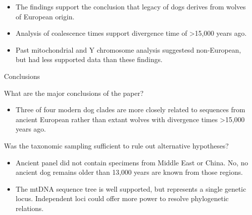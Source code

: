 \documentclass[12pt,a4paper]{article}
\begin{document}
\begin{itemize}
\begin{itemize}
                \begin{itemize}
                    \item The findings support the conclusion that legacy of dogs derives from wolves of European origin.
                    \item Analysis of coalescence times support divergence time of >15,000 years ago.
                    \item Past mitochondrial and Y chromosome analysis suggestesd non-European, but had less supported data than these findings.
                \end{itemize}
        \end{itemize}
    \item Conclusions
        \begin{itemize}
            {\color{darklc} \item  What are the major conclusions of the paper?}
                \begin{itemize}
                    \item Three of four modern dog clades are more closely related to sequences from ancient European rather than extant wolves with divergence times >15,000 years ago.
                \end{itemize}
            {\color{darklc} \item  Was the taxonomic sampling sufficient to rule out alternative hypotheses? }
                \begin{itemize}
                    \item Ancient panel did not contain specimens from Middle East or China. No, no ancient dog remains older than 13,000 years are known from those regions.
                    \item The mtDNA sequence tree is well supported, but represents a single genetic locus. Independent loci could offer more power to resolve phylogenetic relations.
                \end{itemize}
        \end{itemize}
\end{itemize}

\clearpage
{}
\end{document}
